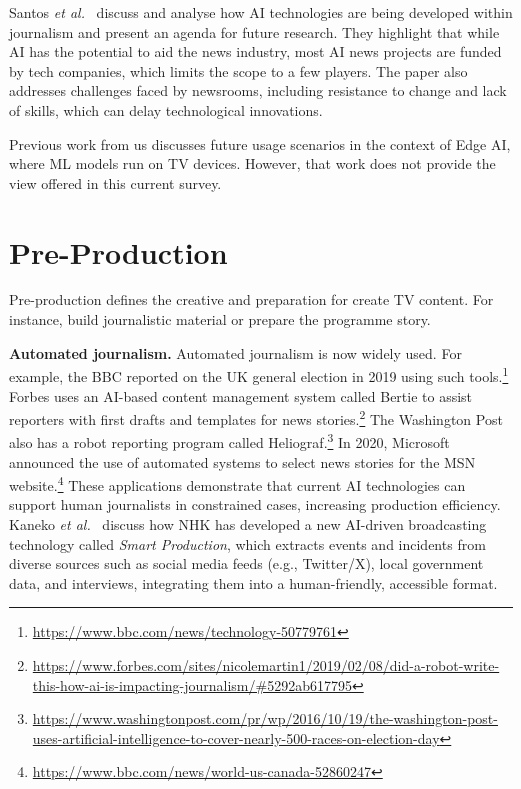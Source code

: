 \documentclass[sigconf,authorversion,review,authordraft]{webmedia}
\newcommand{\etal}[0]{\textit{et al.}~}
\begin{document}
Santos \etal\cite{journalmedia3010002} discuss and analyse how AI technologies are being developed within journalism and present an agenda for future research. They highlight that while \ac{AI} has the potential to aid the news industry, most \ac{AI} news projects are funded by tech companies, which limits the scope to a few players. The paper also addresses challenges faced by newsrooms, including resistance to change and lack of skills, which can delay technological innovations.

Previous work from us \cite{guedes2020future} discusses future usage scenarios in the context of Edge AI, where \ac{ML} models run on TV devices. However, that work does not provide the view offered in this current survey.

\label{sec:pre-production}

\section{Pre-Production}
Pre-production defines the creative and preparation for create TV content. For instance, build journalistic material or prepare the programme story.

\textbf{Automated journalism.} Automated journalism is now widely used. For example, the BBC reported on the UK general election in 2019 using such tools.\footnote{\href{https://www.bbc.com/news/technology-50779761}{https://www.bbc.com/news/technology-50779761}} Forbes uses an AI-based content management system called Bertie to assist reporters with first drafts and templates for news stories.\footnote{\url{https://www.forbes.com/sites/nicolemartin1/2019/02/08/did-a-robot-write-this-how-ai-is-impacting-journalism/\#5292ab617795}} The Washington Post also has a robot reporting program called Heliograf.\footnote{\url{https://www.washingtonpost.com/pr/wp/2016/10/19/the-washington-post-uses-artificial-intelligence-to-cover-nearly-500-races-on-election-day}} In 2020, Microsoft announced the use of automated systems to select news stories for the MSN website.\footnote{\url{https://www.bbc.com/news/world-us-canada-52860247}} These applications demonstrate that current AI technologies can support human journalists in constrained cases, increasing production efficiency. Kaneko \etal\cite{kaneko2020ai} discuss how NHK has developed a new AI-driven broadcasting technology called
\textit{Smart Production}, which extracts events and incidents from diverse sources such as social media feeds (e.g., Twitter/X), local government data, and interviews, integrating them into a human-friendly, accessible format.
\end{document}
